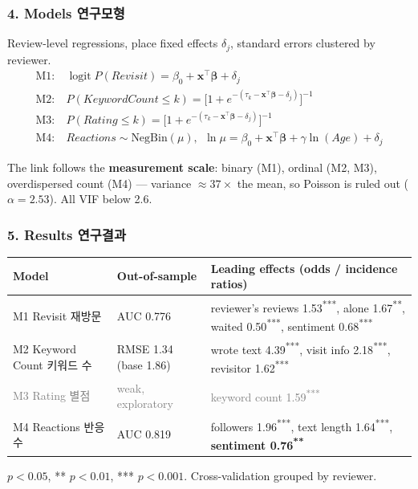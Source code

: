 \documentclass[compress]{beamer}
\newcommand{\ko}[1]{{\footnotesize\color{black!50}#1}}
\newcommand{\kosub}[1]{{\scriptsize\color{black!55}#1}}
\newcommand{\aside}[1]{%
  \begin{center}\colorbox{UBIblue!12}{%
    \parbox{\dimexpr\textwidth-14pt\relax}{\vspace{2pt}#1\vspace{2pt}}}\end{center}}
\begin{document}
\begin{frame}
\frametitle{4. Models \ko{연구모형}}
{\scriptsize Review-level regressions, place fixed effects $\delta_j$, standard
errors clustered by reviewer.}
{\scriptsize
\begin{align*}
  \text{M1:}\ & \operatorname{logit} P(\textit{Revisit}) = \beta_0 + \mathbf{x}^\top\boldsymbol\beta + \delta_j \\[-3pt]
  \text{M2:}\ & P(\textit{KeywordCount} \le k) = \big[1 + e^{-(\tau_k - \mathbf{x}^\top\boldsymbol\beta - \delta_j)}\big]^{-1} \\[-3pt]
  \text{M3:}\ & P(\textit{Rating} \le k) = \big[1 + e^{-(\tau_k - \mathbf{x}^\top\boldsymbol\beta - \delta_j)}\big]^{-1} \\[-3pt]
  \text{M4:}\ & \textit{Reactions} \sim \text{NegBin}(\mu),\ \
                \ln \mu = \beta_0 + \mathbf{x}^\top\boldsymbol\beta + \gamma\ln(\textit{Age}) + \delta_j
\end{align*}}
\vspace{-6pt}
\aside{\scriptsize
  The link follows the \textbf{measurement scale}: binary (M1), ordinal (M2,
  M3), overdispersed count (M4) — variance $\approx 37\times$ the mean, so
  Poisson is ruled out ($\alpha = 2.53$). All VIF below 2.6.}
\end{frame}

\begin{frame}
\frametitle{5. Results \ko{연구결과}}
\begin{center}
{\tiny\color{black}
\begin{tabular}{@{}p{2.0cm}p{2.2cm}p{5.2cm}@{}}
  \toprule
  \textbf{Model} & \textbf{Out-of-sample} &
  \textbf{Leading effects (odds / incidence ratios)} \\
  \midrule
  M1 Revisit \kosub{재방문} & AUC 0.776 &
    reviewer's reviews 1.53\textsuperscript{***}, alone 1.67\textsuperscript{**},
    waited 0.50\textsuperscript{***}, sentiment 0.68\textsuperscript{***} \\[3pt]
  M2 Keyword Count \kosub{키워드 수} & RMSE 1.34 (base 1.86) &
    wrote text 4.39\textsuperscript{***}, visit info 2.18\textsuperscript{***},
    revisitor 1.62\textsuperscript{***} \\[3pt]
  \textcolor{gray}{M3 Rating \kosub{별점}} & \textcolor{gray}{weak, exploratory} &
    \textcolor{gray}{keyword count 1.59\textsuperscript{***}} \\[3pt]
  M4 Reactions \kosub{반응 수} & AUC 0.819 &
    followers 1.96\textsuperscript{***}, text length 1.64\textsuperscript{***},
    \textbf{sentiment 0.76\textsuperscript{**}} \\
  \bottomrule
\end{tabular}}
\end{center}
{\tiny * $p<0.05$, ** $p<0.01$, *** $p<0.001$. Cross-validation grouped by
 reviewer.}
\end{frame}
\end{document}
